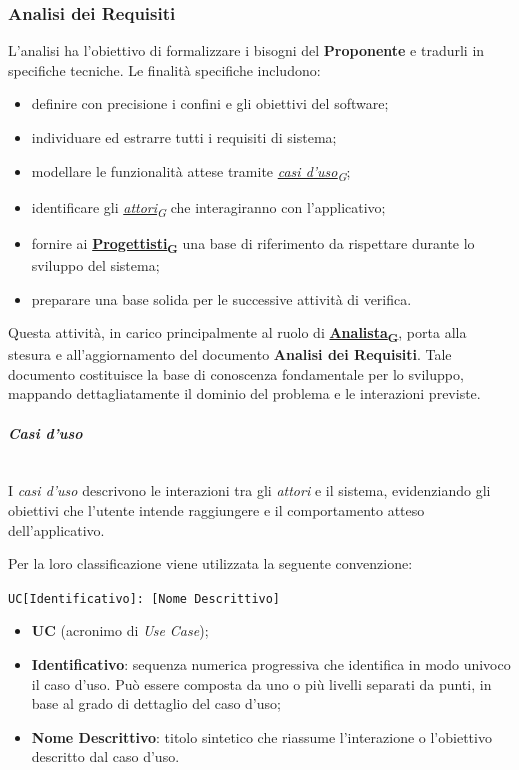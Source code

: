 \documentclass[12pt, a4paper]{article}
\newcommand{\urlglossario}{https://skynetunigroup.github.io/Code_Guardian/Documentazione/PB/glossario_v2.0.0.pdf} %
\newcommand{\glo}[2]{\href{\urlglossario\#nameddest=#2}{#1\textsubscript{G}}}
\begin{document}
\subsubsection{Analisi dei Requisiti}

L'analisi ha l'obiettivo di formalizzare i bisogni del \textbf{Proponente} e tradurli in specifiche tecniche. Le finalità specifiche includono:
\begin{itemize}
    \item definire con precisione i confini e gli obiettivi del software;
    \item individuare ed estrarre tutti i requisiti di sistema;
    \item modellare le funzionalità attese tramite \textit{\glo{casi d'uso}{use-case}};
    \item identificare gli \textit{\glo{attori}{attore}} che interagiranno con l'applicativo;
    \item fornire ai \textbf{\glo{Progettisti}{progettista}} una base di riferimento da rispettare durante lo sviluppo del sistema;
    \item preparare una base solida per le successive attività di verifica.
\end{itemize}

Questa attività, in carico principalmente al ruolo di \textbf{\glo{Analista}{analista}}, porta alla stesura e all'aggiornamento del documento \textbf{Analisi dei Requisiti}. Tale documento costituisce la base di conoscenza fondamentale per lo sviluppo, mappando dettagliatamente il dominio del problema e le interazioni previste.

\paragraph{\textit{Casi d'uso}}\mbox{}\\
I \textit{casi d'uso} descrivono le interazioni tra gli \textit{attori} e il sistema, evidenziando gli obiettivi che l'utente intende raggiungere e il comportamento atteso dell'applicativo.

Per la loro classificazione viene utilizzata la seguente convenzione:

\begin{center}
    \texttt{UC[Identificativo]: [Nome Descrittivo]}
\end{center}

\begin{itemize}
    \item \textbf{UC} (acronimo di \textit{Use Case});

    \item \textbf{Identificativo}: sequenza numerica progressiva che identifica in modo univoco il caso d'uso. Può essere composta da uno o più livelli separati da punti, in base al grado di dettaglio del caso d'uso;

    \item \textbf{Nome Descrittivo}: titolo sintetico che riassume l'interazione o l'obiettivo descritto dal caso d'uso.
\end{itemize}
\end{document}
